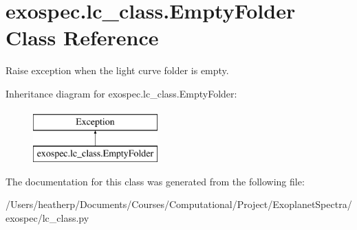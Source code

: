 \hypertarget{classexospec_1_1lc__class_1_1_empty_folder}{}\section{exospec.\+lc\+\_\+class.\+Empty\+Folder Class Reference}
\label{classexospec_1_1lc__class_1_1_empty_folder}


Raise exception when the light curve folder is empty.  


Inheritance diagram for exospec.\+lc\+\_\+class.\+Empty\+Folder\+:\begin{figure}[H]
\begin{center}
\leavevmode
\includegraphics[height=2.000000cm]{classexospec_1_1lc__class_1_1_empty_folder}
\end{center}
\end{figure}


The documentation for this class was generated from the following file\+:\begin{DoxyCompactItemize}
\item 
/\+Users/heatherp/\+Documents/\+Courses/\+Computational/\+Project/\+Exoplanet\+Spectra/exospec/lc\+\_\+class.\+py\end{DoxyCompactItemize}
